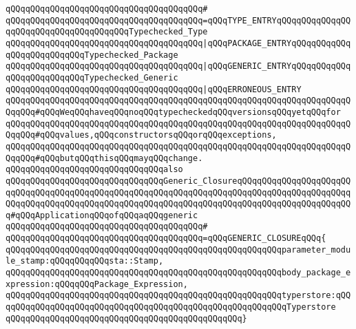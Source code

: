 \verb|qQQqqQQqqQQqqQQqqQQqqQQqqQQqqQQqqQQqqQQq#|\newline
\verb|qQQqqQQqqQQqqQQqqQQqqQQqqQQqqQQqqQQqqQQq=qQQqTYPE_ENTRYqQQqqQQqqQQqqQQqqQQqqQQqqQQqqQQqqQQqqQQqTypechecked_Type|\newline
\verb|qQQqqQQqqQQqqQQqqQQqqQQqqQQqqQQqqQQqqQQq|\verb#|qQQqPACKAGE_ENTRYqQQqqQQqqQQqqQQqqQQqqQQqqQQqTypechecked_Package#\newline
\verb|qQQqqQQqqQQqqQQqqQQqqQQqqQQqqQQqqQQqqQQq|\verb#|qQQqGENERIC_ENTRYqQQqqQQqqQQqqQQqqQQqqQQqqQQqTypechecked_Generic#\newline
\verb|qQQqqQQqqQQqqQQqqQQqqQQqqQQqqQQqqQQqqQQq|\verb#|qQQqERRONEOUS_ENTRY#\newline
\newline
\verb|qQQqqQQqqQQqqQQqqQQqqQQqqQQqqQQqqQQqqQQqqQQqqQQqqQQqqQQqqQQqqQQqqQQqqQQqqQQq#qQQqWeqQQqhaveqQQqnoqQQqtypecheckedqQQqversionsqQQqyetqQQqfor|\newline
\verb|qQQqqQQqqQQqqQQqqQQqqQQqqQQqqQQqqQQqqQQqqQQqqQQqqQQqqQQqqQQqqQQqqQQqqQQqqQQq#qQQqvalues,qQQqconstructorsqQQqorqQQqexceptions,|\newline
\verb|qQQqqQQqqQQqqQQqqQQqqQQqqQQqqQQqqQQqqQQqqQQqqQQqqQQqqQQqqQQqqQQqqQQqqQQqqQQq#qQQqbutqQQqthisqQQqmayqQQqchange.|\newline
\newline
\newline
\newline
\verb|qQQqqQQqqQQqqQQqqQQqqQQqqQQqqQQqalso|\newline
\verb|qQQqqQQqqQQqqQQqqQQqqQQqqQQqqQQqGeneric_ClosureqQQqqQQqqQQqqQQqqQQqqQQqqQQqqQQqqQQqqQQqqQQqqQQqqQQqqQQqqQQqqQQqqQQqqQQqqQQqqQQqqQQqqQQqqQQqqQQqqQQqqQQqqQQqqQQqqQQqqQQqqQQqqQQqqQQqqQQqqQQqqQQqqQQqqQQqqQQqqQQqqQQq#qQQqApplicationqQQqofqQQqaqQQqgeneric|\newline
\verb|qQQqqQQqqQQqqQQqqQQqqQQqqQQqqQQqqQQqqQQq#|\newline
\verb|qQQqqQQqqQQqqQQqqQQqqQQqqQQqqQQqqQQqqQQq=qQQqGENERIC_CLOSUREqQQq{|\newline
\verb|qQQqqQQqqQQqqQQqqQQqqQQqqQQqqQQqqQQqqQQqqQQqqQQqqQQqqQQqparameter_module_stamp:qQQqqQQqqQQqsta::Stamp,|\newline
\verb|qQQqqQQqqQQqqQQqqQQqqQQqqQQqqQQqqQQqqQQqqQQqqQQqqQQqqQQqbody_package_expression:qQQqqQQqPackage_Expression,|\newline
\verb|qQQqqQQqqQQqqQQqqQQqqQQqqQQqqQQqqQQqqQQqqQQqqQQqqQQqqQQqtyperstore:qQQqqQQqqQQqqQQqqQQqqQQqqQQqqQQqqQQqqQQqqQQqqQQqqQQqqQQqqQQqTyperstore|\newline
\verb|qQQqqQQqqQQqqQQqqQQqqQQqqQQqqQQqqQQqqQQqqQQqqQQq}|\newline
